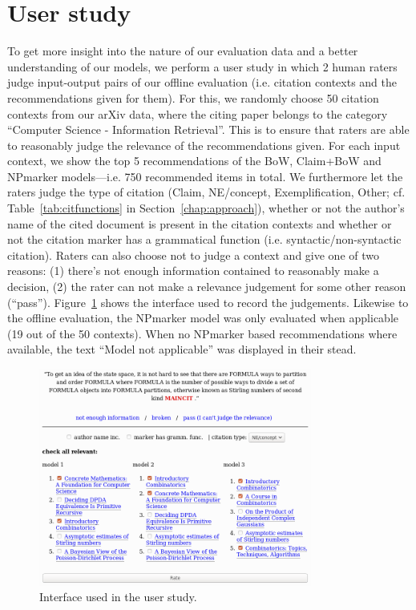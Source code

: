 \section{User study}\label{sec:oneval}
To get more insight into the nature of our evaluation data and a better understanding of our models, we perform a user study in which 2 human raters judge input-output pairs of our offline evaluation (i.e. citation contexts and the recommendations given for them). For this, we randomly choose 50 citation contexts from our arXiv data, where the citing paper belongs to the category ``Computer Science - Information Retrieval''. This is to ensure that raters are able to reasonably judge the relevance of the recommendations given. For each input context, we show the top 5 recommendations of the BoW, Claim+BoW and NPmarker models---i.e. 750 recommended items in total. We furthermore let the raters judge the type of citation (Claim, NE/concept, Exemplification, Other; cf. Table~\ref{tab:citfunctions} in Section~\ref{chap:approach}), whether or not the author's name of the cited document is present in the citation contexts and whether or not the citation marker has a grammatical function (i.e. syntactic/non-syntactic citation). Raters can also choose not to judge a context and give one of %
two reasons: (1) there's not enough information contained to reasonably make a decision, %
(2) the rater can not make a relevance judgement for some other reason (``pass''). Figure~\ref{fig:interface} shows the interface used to record the judgements. Likewise to the offline evaluation, the NPmarker model was only evaluated when applicable (19 out of the 50 contexts). When no NPmarker based recommendations where available, the text ``Model not applicable'' was displayed in their stead.


\begin{figure}[t]
  \centering
    \includegraphics[width=0.8\textwidth]{figures/evaluation/interface.png}
  \caption{Interface used in the user study.}
  \label{fig:interface}
\end{figure}

